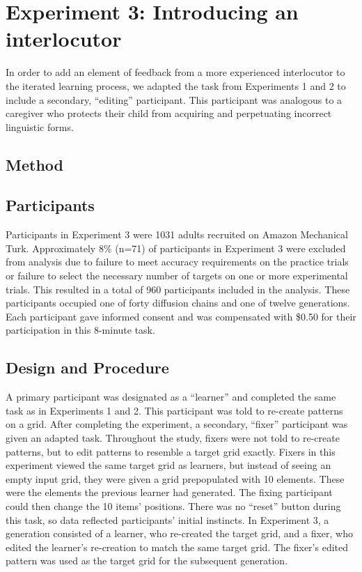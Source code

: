 \documentclass[10pt, letterpaper]{article}
\begin{document}
\section{Experiment 3: Introducing an
interlocutor}\label{experiment-3-introducing-an-interlocutor}

In order to add an element of feedback from a more experienced
interlocutor to the iterated learning process, we adapted the task from
Experiments 1 and 2 to include a secondary, ``editing'' participant.
This participant was analogous to a caregiver who protects their child
from acquiring and perpetuating incorrect linguistic forms.

\subsection{Method}\label{method-2}

\subsection{Participants}\label{participants-2}

Participants in Experiment 3 were 1031 adults recruited on Amazon
Mechanical Turk. Approximately 8\% (n=71) of participants in Experiment
3 were excluded from analysis due to failure to meet accuracy
requirements on the practice trials or failure to select the necessary
number of targets on one or more experimental trials. This resulted in a
total of 960 participants included in the analysis. These participants
occupied one of forty diffusion chains and one of twelve generations.
Each participant gave informed consent and was compensated with \$0.50
for their participation in this 8-minute task.

\subsection{Design and Procedure}\label{design-and-procedure-2}

A primary participant was designated as a ``learner'' and completed the
same task as in Experiments 1 and 2. This participant was told to
re-create patterns on a grid. After completing the experiment, a
secondary, ``fixer'' participant was given an adapted task. Throughout
the study, fixers were not told to re-create patterns, but to edit
patterns to resemble a target grid exactly. Fixers in this experiment
viewed the same target grid as learners, but instead of seeing an empty
input grid, they were given a grid prepopulated with 10 elements. These
were the elements the previous learner had generated. The fixing
participant could then change the 10 items' positions. There was no
``reset'' button during this task, so data reflected participants'
initial instincts. In Experiment 3, a generation consisted of a learner,
who re-created the target grid, and a fixer, who edited the learner's
re-creation to match the same target grid. The fixer's edited pattern
was used as the target grid for the subsequent generation.
\end{document}

